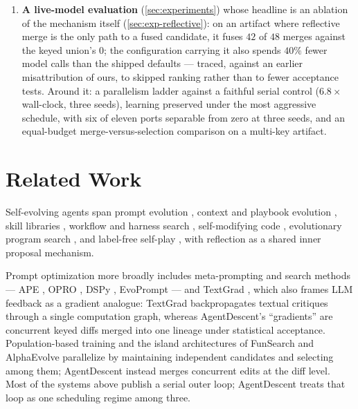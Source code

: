\documentclass{article}
\begin{document}
\begin{enumerate}
  \item \textbf{A live-model evaluation} (\cref{sec:experiments}) whose headline is an ablation of the mechanism itself (\cref{sec:exp-reflective}): on an artifact where reflective merge is the only path to a fused candidate, it fuses $42$ of $48$ merges against the keyed union's $0$; the configuration carrying it also spends $40\%$ fewer model calls than the shipped defaults --- traced, against an earlier misattribution of ours, to skipped ranking rather than to fewer acceptance tests. Around it: a parallelism ladder against a faithful serial control ($6.8\times$ wall-clock, three seeds), learning preserved under the most aggressive schedule, with six of eleven ports separable from zero at three seeds, and an equal-budget merge-versus-selection comparison on a multi-key artifact.
\end{enumerate}

\section{Related Work}
\label{sec:related}

Self-evolving agents span prompt evolution \citep{fernando2023promptbreeder,agrawal2025gepa}, context and playbook evolution \citep{zhang2025ace}, skill libraries \citep{wang2023voyager,zheng2025skillweaver}, workflow and harness search \citep{zhang2024aflow,hu2024adas}, self-modifying code \citep{zhang2025dgm,robeyns2025sica,yin2024godel}, evolutionary program search \citep{novikov2025alphaevolve,romera2024funsearch,openevolve2025,mouret2015mapelites,lehman2023elm}, and label-free self-play \citep{zhao2025absolutezero,huang2025rzero,xia2025agent0}, with reflection \citep{madaan2023selfrefine,shinn2023reflexion} as a shared inner proposal mechanism. 

Prompt optimization more broadly includes meta-prompting and search methods --- APE \citep{zhou2023ape}, OPRO \citep{yang2024opro}, DSPy \citep{khattab2024dspy}, EvoPrompt \citep{guo2024evoprompt} --- and TextGrad \citep{yuksekgonul2024textgrad}, which also frames LLM feedback as a gradient analogue: TextGrad backpropagates textual critiques through a single computation graph, whereas AgentDescent's ``gradients'' are concurrent keyed diffs merged into one lineage under statistical acceptance. Population-based training \citep{jaderberg2017pbt} and the island architectures of FunSearch and AlphaEvolve parallelize by maintaining independent candidates and selecting among them; AgentDescent instead merges concurrent edits at the diff level. Most of the systems above publish a serial outer loop; AgentDescent treats that loop as one scheduling regime among three. 
\end{document}

